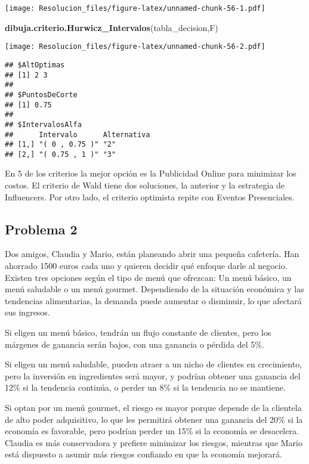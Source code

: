 \documentclass[
]{article}
\newenvironment{Shaded}{\begin{snugshade}}{\end{snugshade}}
\newcommand{\FunctionTok}[1]{\textcolor[rgb]{0.13,0.29,0.53}{\textbf{#1}}}
\newcommand{\NormalTok}[1]{#1}
\begin{document}
\texttt{[image: Resolucion\_files/figure-latex/unnamed-chunk-56-1.pdf]}

\begin{Shaded}
\begin{Highlighting}[]
\FunctionTok{dibuja.criterio.Hurwicz\_Intervalos}\NormalTok{(tabla\_decision,F)}
\end{Highlighting}
\end{Shaded}

\texttt{[image: Resolucion\_files/figure-latex/unnamed-chunk-56-2.pdf]}

\begin{verbatim}
## $AltOptimas
## [1] 2 3
## 
## $PuntosDeCorte
## [1] 0.75
## 
## $IntervalosAlfa
##      Intervalo      Alternativa
## [1,] "( 0 , 0.75 )" "2"        
## [2,] "( 0.75 , 1 )" "3"
\end{verbatim}

En 5 de los criterios la mejor opción es la Publicidad Online para
minimizar los costos. El criterio de Wald tiene dos soluciones, la
anterior y la estrategia de Influencers. Por otro lado, el criterio
optimista repite con Eventos Presenciales.

\subsection{Problema 2}\label{problema-2-3}

Dos amigos, Claudia y Mario, están planeando abrir una pequeña
cafetería. Han ahorrado 1500 euros cada uno y quieren decidir qué
enfoque darle al negocio. Existen tres opciones según el tipo de menú
que ofrezcan: Un menú básico, un menú saludable o un menú gourmet.
Dependiendo de la situación económica y las tendencias alimentarias, la
demanda puede aumentar o disminuir, lo que afectará sus ingresos.

Si eligen un menú básico, tendrán un flujo constante de clientes, pero
los márgenes de ganancia serán bajos, con una ganancia o pérdida del
5\%.

Si eligen un menú saludable, pueden atraer a un nicho de clientes en
crecimiento, pero la inversión en ingredientes será mayor, y podrían
obtener una ganancia del 12\% si la tendencia continúa, o perder un 8\%
si la tendencia no se mantiene.

Si optan por un menú gourmet, el riesgo es mayor porque depende de la
clientela de alto poder adquisitivo, lo que les permitirá obtener una
ganancia del 20\% si la economía es favorable, pero podrían perder un
15\% si la economía se desacelera. Claudia es más conservadora y
prefiere minimizar los riesgos, mientras que Mario está dispuesto a
asumir más riesgos confiando en que la economía mejorará.
\end{document}
